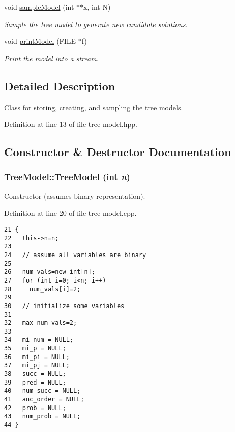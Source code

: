 \begin{CompactItemize}
void \hyperlink{class_tree_model_37e0258535bee44a401ac41f73725122}{sample\-Model} (int $\ast$$\ast$x, int N)
\begin{CompactList}\small\item\em Sample the tree model to generate new candidate solutions. \item\end{CompactList}\item 
void \hyperlink{class_tree_model_78a4e01188411739ffbe132a48afa78b}{print\-Model} (FILE $\ast$f)
\begin{CompactList}\small\item\em Print the model into a stream. \item\end{CompactList}\end{CompactItemize}


\subsection{Detailed Description}
Class for storing, creating, and sampling the tree models. 



Definition at line 13 of file tree-model.hpp.

\subsection{Constructor \& Destructor Documentation}
\hypertarget{class_tree_model_eabf8492e9e205ae30e49f53e0d9957d}{
\subsubsection[TreeModel]{\setlength{\rightskip}{0pt plus 5cm}Tree\-Model::Tree\-Model (int {\em n})}}
\label{class_tree_model_eabf8492e9e205ae30e49f53e0d9957d}


Constructor (assumes binary representation). 



Definition at line 20 of file tree-model.cpp.

\begin{Code}\begin{verbatim}21 {
22   this->n=n;
23 
24   // assume all variables are binary
25 
26   num_vals=new int[n];
27   for (int i=0; i<n; i++)
28     num_vals[i]=2;
29 
30   // initialize some variables
31 
32   max_num_vals=2;
33 
34   mi_num = NULL;
35   mi_p = NULL;
36   mi_pi = NULL;
37   mi_pj = NULL;
38   succ = NULL;
39   pred = NULL;
40   num_succ = NULL;
41   anc_order = NULL;
42   prob = NULL;
43   num_prob = NULL;
44 }
\end{verbatim}\end{Code}


